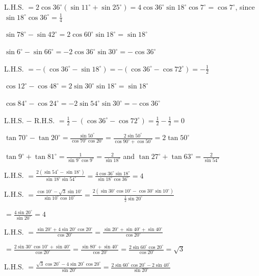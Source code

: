   L.H.S. $= 2\cos 36^\circ(\sin 11^\circ + \sin 25^\circ) = 4\cos 36^\circ\sin 18^\circ\cos 7^\circ = \cos 7^\circ$, since $\sin
  18^\circ\cos 36^\circ = \frac{1}{4}$

\item $\sin 78^\circ - \sin 42^\circ = 2\cos 60^\circ\sin 18^\circ = \sin 18^\circ$

  $\sin 6^\circ - \sin 66^\circ = -2\cos 36^\circ\sin 30^\circ = -\cos 36^\circ$

  L.H.S. $= -(\cos 36^\circ - \sin 18^\circ) = -(\cos 36^\circ - \cos 72^\circ) = -\frac{1}{2}$

\item $\cos 12^\circ - \cos 48^\circ = 2\sin 30^\circ\sin 18^\circ = \sin 18^\circ$

  $\cos 84^\circ - \cos 24^\circ = -2\sin 54^\circ\sin 30^\circ = -\cos 36^\circ$

  L.H.S. $-$ R.H.S. $= \frac{1}{2} - (\cos 36^\circ - \cos 72^\circ) = \frac{1}{2} - \frac{1}{2} = 0$

\item $\tan 70^\circ - \tan 20^\circ = \frac{\sin 50^\circ}{\cos 70^\circ\cos 20^\circ} = \frac{2\sin 50^\circ}{\cos 90^\circ +
  \cos 50^\circ} = 2\tan 50^\circ$

\item $\tan 9^\circ + \tan 81^\circ = \frac{1}{\sin 9^\circ\cos 9^\circ} = \frac{2}{\sin 18^\circ}$ and $\tan 27^\circ + \tan
  63^\circ = \frac{2}{\sin 54^\circ}$

  L.H.S. $= \frac{2(\sin 54^\circ - \sin 18^\circ)}{\sin 18^\circ\sin 54^\circ} = \frac{4\cos 36^\circ\sin 18^\circ}{\sin
  18^\circ\cos 36^\circ} = 4$

\item L.H.S. $= \frac{\cos 10^\circ - \sqrt{3}\sin 10^\circ}{\sin 10^\circ\cos 10^\circ} = \frac{2(\sin 30^\circ\cos 10^\circ -
  \cos 30^\circ\sin 10^\circ)}{\frac{1}{2}\sin 20^\circ}$

  $= \frac{4\sin 20^\circ}{\sin 20^\circ} = 4$

\item L.H.S. $= \frac{\sin 20^\circ + 4\sin 20^\circ\cos 20^\circ}{\cos 20^\circ} = \frac{\sin 20^\circ + \sin 40^\circ + \sin
  40^\circ}{\cos 20^\circ}$

  $= \frac{2\sin 30^\circ\cos 10^\circ + \sin 40^\circ}{\cos 20^\circ} = \frac{\sin 80^\circ + \sin 40^\circ}{\cos 20^\circ}
  = \frac{2\sin 60^\circ\cos 20^\circ}{\cos 20^\circ} = \sqrt{3}$

\item L.H.S. $= \frac{\sqrt{3}\cos 20^\circ - 4\sin 20^\circ\cos 20^\circ}{\sin 20^\circ} = \frac{2\sin 60^\circ\cos 20^\circ -
  2\sin 40^\circ}{\sin 20^\circ}$

